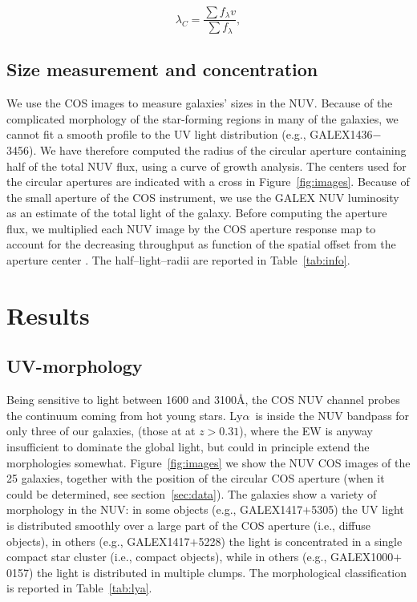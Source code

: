 \documentclass[manuscript]{emulateapj}
\newcommand{\lya}{Ly$\alpha$}
\begin{document}
\begin{equation}
\lambda_C=\frac{\sum{f_{\lambda}v}}{\sum{f_{\lambda}}},
\end{equation}

\subsection{Size measurement and concentration}
We use the COS images to measure galaxies' sizes in the NUV.  Because
of the complicated morphology of the star-forming regions in many of
the galaxies, we cannot fit a smooth profile to the UV light
distribution (e.g., GALEX1436$-$3456). We have therefore computed the
radius of the circular aperture containing half of the total NUV flux,
using a curve of growth analysis. The centers used for the circular
apertures are indicated with a cross in Figure~\ref{fig:images}.
Because of the small aperture of the COS instrument, we use the GALEX
NUV luminosity as an estimate of the total light of the
galaxy. Before computing the aperture flux, we multiplied each
NUV image by the COS aperture response map to account for the
decreasing throughput as function of the spatial offset from the
aperture center \citep{Goudfrooij2010}. The half--light--radii are
reported in Table~\ref{tab:info}.

\section{Results}

\subsection{UV-morphology}
Being sensitive to light between 1600 and 3100\AA, the COS NUV channel
probes the continuum coming from hot young stars.  \lya\ is inside the
NUV bandpass for only three of our galaxies, (those at at $z>0.31$),
where the EW is anyway insufficient to dominate the global light, but
could in principle extend the morphologies somewhat.
Figure~\ref{fig:images} we show the NUV COS images of the 25 galaxies,
together with the position of the circular COS aperture (when it could
be determined, see section~\ref{sec:data}). The galaxies show a
variety of morphology in the NUV: in some objects (e.g.,
GALEX1417$+$5305) the UV light is distributed smoothly over a large
part of the COS aperture (i.e., diffuse objects), in others (e.g.,
GALEX1417$+$5228) the light is concentrated in a single compact star
cluster (i.e., compact objects), while in others (e.g.,
GALEX1000$+$0157) the light is distributed in multiple clumps.  The
morphological classification is reported in Table~\ref{tab:lya}.
\end{document}
